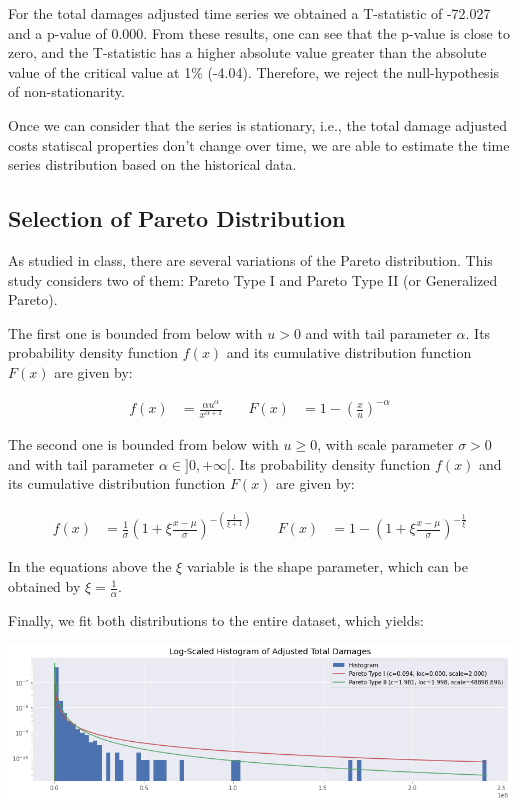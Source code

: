 \documentclass[paper=a4, fontsize=11pt]{scrartcl} %
\begin{document}
For the total damages adjusted time series we obtained a T-statistic of -72.027 and a p-value of 0.000. From these results, one can see that the p-value is close to zero, and the T-statistic has a higher absolute value greater than the absolute value of the critical value at 1\% (-4.04). Therefore, we reject the null-hypothesis of non-stationarity.

Once we can consider that the series is stationary, i.e., the total damage adjusted costs  statiscal properties don't change over time, we are able to estimate the time series distribution based on the historical data. 

\subsection{Selection of Pareto Distribution}

As studied in class, there are several variations of the Pareto distribution. This study considers two of them: Pareto Type I and Pareto Type II (or Generalized Pareto).

The first one is bounded from below with $u > 0$ and with tail parameter $\alpha$. Its probability density function $f(x)$ and its cumulative distribution function $F(x)$ are given by:

\begin{align*}
    f(x) & = \frac{\alpha u^\alpha}{x^{\alpha + 1}}
    & \quad
    F(x) & = 1 - \left(\frac{x}{u}\right)^{-\alpha}
\end{align*}

The second one is bounded from below with $u \geq 0$, with scale parameter $\sigma > 0$ and with tail parameter $\alpha \in ]0, +\infty[$. Its probability density function $f(x)$ and its cumulative distribution function $F(x)$ are given by:

\begin{align*}
    f(x) & = \frac{1}{\sigma} \left(1 + \xi \frac{x - \mu}{\sigma}\right)^{-(\frac{1}{\xi + 1})}
    & \quad 
    F(x) & = 1 - \left(1 + \xi \frac{x - \mu}{\sigma}\right)^{-\frac{1}{\xi}}
\end{align*}

In the equations above the $\xi$ variable is the shape parameter, which can be obtained by $\xi = \frac{1}{\alpha}$.

Finally, we fit both distributions to the entire dataset, which yields:

\begin{center}
    \includegraphics[scale=0.5]{imgs/log_scaled_histogram_adjusted_total_damages.png}
\end{center}
\end{document}
